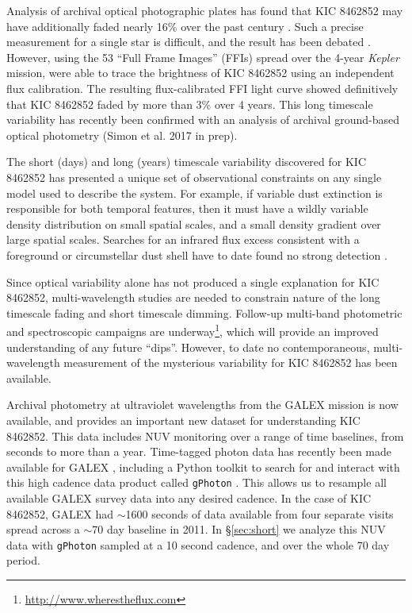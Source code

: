 \documentclass[twocolumn]{aastex6}
\newcommand{\Kepler}{\textsl{Kepler}\xspace}
\begin{document}
Analysis of archival optical photographic plates has found that KIC 8462852 may have additionally faded nearly 16\% over the past century \citep{schaefer2016}. Such a precise measurement for a single star is difficult, and the result has been debated \citep{hippke2016}. However, using the 53 ``Full Frame Images'' (FFIs) spread over the 4-year \Kepler mission, \citet{montet2016} were able to trace the brightness of KIC 8462852 using an independent flux calibration. The resulting flux-calibrated FFI light curve showed definitively that KIC 8462852 faded by more than 3\% over 4 years. This long timescale variability has recently been confirmed with an analysis of archival ground-based optical photometry (Simon et al. 2017 in prep).

The short (days) and long (years) timescale variability discovered for KIC 8462852 has presented a unique set of observational constraints on any single model used to describe the system. For example, if variable dust extinction is responsible for both temporal features, then it must have a wildly variable density distribution on small spatial scales, and a small density gradient over large spatial scales. Searches for an infrared flux excess consistent with a foreground or circumstellar dust shell have to date found no strong detection \citep{marengo2015}.


Since optical variability alone has not produced a single explanation for KIC 8462852, multi-wavelength studies are needed to constrain nature of the long timescale fading and short timescale dimming. Follow-up multi-band photometric and spectroscopic campaigns are underway\footnote{\url{http://www.wherestheflux.com}}, which will provide an improved understanding of any future ``dips''. However, to date no contemporaneous, multi-wavelength  measurement of the mysterious variability for KIC 8462852 has been available.


Archival photometry at ultraviolet wavelengths from the GALEX mission \citep{galex} is now available, and provides an important new dataset for understanding KIC 8462852. This data includes NUV monitoring over a range of time baselines, from seconds to more than a year. Time-tagged photon data has recently been made available for GALEX \citep{million2016}, including a Python toolkit to search for and interact with this high cadence data product called {\tt gPhoton} \citep{gphoton}. This allows us to resample all available GALEX survey data into any desired cadence. In the case of KIC 8462852, GALEX had $\sim$1600 seconds of data available from four separate visits spread across a $\sim$70 day baseline in 2011. In \S\ref{sec:short} we analyze this NUV data with {\tt gPhoton} sampled at a 10 second cadence, and over the whole 70 day period.
\end{document}
